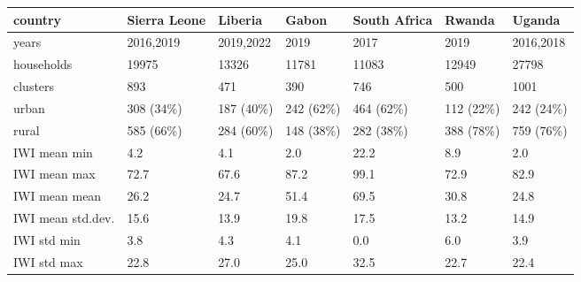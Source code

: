 \begin{tabular}{lllllll}
\toprule
country &                        Sierra Leone &                  Liberia &        Gabon &   South Africa &       Rwanda &                              Uganda \\
\midrule
years                         &                           2016,2019 &                2019,2022 &         2019 &           2017 &         2019 &                           2016,2018 \\
households                    &                               19975 &                    13326 &        11781 &          11083 &        12949 &                               27798 \\
clusters                      &                                 893 &                      471 &          390 &            746 &          500 &                                1001 \\
urban                         &                           308 (34\%) &                187 (40\%) &    242 (62\%) &      464 (62\%) &    112 (22\%) &                           242 (24\%) \\
rural                         &                           585 (66\%) &                284 (60\%) &    148 (38\%) &      282 (38\%) &    388 (78\%) &                           759 (76\%) \\
IWI mean min                  &                                 4.2 &                      4.1 &          2.0 &           22.2 &          8.9 &                                 2.0 \\
IWI mean max                  &                                72.7 &                     67.6 &         87.2 &           99.1 &         72.9 &                                82.9 \\
IWI mean mean                 &                                26.2 &                     24.7 &         51.4 &           69.5 &         30.8 &                                24.8 \\
IWI mean std.dev.             &                                15.6 &                     13.9 &         19.8 &           17.5 &         13.2 &                                14.9 \\
IWI std min                   &                                 3.8 &                      4.3 &          4.1 &            0.0 &          6.0 &                                 3.9 \\
IWI std max                   &                                22.8 &                     27.0 &         25.0 &           32.5 &         22.7 &                                22.4 \\

\end{tabular}
